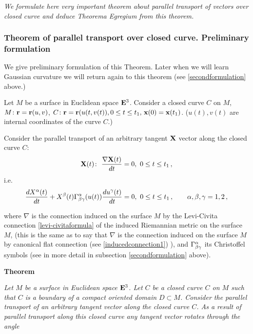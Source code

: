 \documentclass[12pt]{article}
\theoremstyle{theorem}
\numberwithin{equation}{section}
\begin{document}
{\sl We formulate here very important theorem
about  parallel transport of vectors
over closed curve and deduce 
Theorema Egregium from this theorem.  





\subsubsection  {Theorem of parallel transport over closed curve. Preliminary
formulation}\label{firstformulation}

  We give preliminary formulation of this Theorem. Later
when we will learn Gaussian curvature we will
return again to this theorem (see \ref{secondformulation} above.)



Let $M$ be a surface in  Euclidean space ${\bf E}^3$.
  Consider a closed curve $C$ on $M$,
  $M\colon {\bf r}={\bf r}(u,v)$, $C\colon {\bf r}={\bf r}(u(t,v(t)), 0\leq t\leq t_1, \, {\bf x}(0)={\bf x}(t_1)$.
  ($u(t), v(t)$ are internal coordinates of the curve $C$.)

Consider the parallel transport of an 
arbitrary tangent ${\bf X}$ vector along the closed curve $C$:
           \begin{equation*}\label{paraltransportalongclosedcurve2}
{\bf X}(t)\colon\,\, {\nabla {\bf X}(t)\over dt}=0,\,\, 0\leq t\leq t_1\,,
          \end{equation*}
i.e.
                \begin{equation}\label{paraltransportalongclosedcurve3}
{d X^\alpha(t)\over dt}+
X^\beta(t)\Gamma^\alpha_{\beta\gamma}(u(t))
{du^\gamma(t)\over dt}=0,\,\, 0\leq t\leq t_1\,,\qquad \alpha,\beta,\gamma=1,2\,,
          \end{equation}

where $\nabla$ is the connection induced on the surface $M$ by
the Levi-Civita connection \eqref{levi-civitaformula}
of the induced Riemannian metric on the surface $M$,
(this is the same as to say that $\nabla$ is the connection induced on the surface $M$ by canonical flat connection
(see \eqref{inducedconnection1}) ),
and $\Gamma^\alpha_{\beta\gamma}$ its Christoffel symbols
(see in more detail in subsection \ref{secondformulation} above).

\m

{\bf Theorem}
{\it  Let $M$ be a surface in  Euclidean space ${\bf E}^3$.
  Let $C$ be a closed curve $C$ on $M$ such that $C$ 
is a boundary of a compact oriented domain $D\subset M$.
Consider the parallel transport of an arbitrary tangent vector 
along the closed curve $C$.
As a result of parallel transport along this closed curve 
any  tangent vector rotates through the angle

}}
\end{document}
